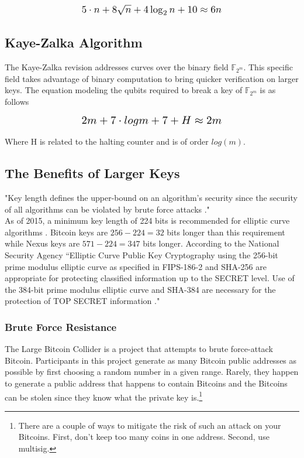 \documentclass[11pt]{article}
\begin{document}
\begin{equation}
\resizebox{.5\hsize}{!}{$5\cdot n + 8 \sqrt{n} + 4 \log_{2} n + 10 \approx 6n$}
\end{equation}

\subsection{Kaye-Zalka Algorithm}
The Kaye-Zalka revision addresses curves over the binary field $\mathbb{F}_{2^m}$. This specific field takes advantage of binary computation to bring quicker verification on larger keys. The equation modeling the qubits required to break a key of $\mathbb{F}_{2^m}$ is as follows \cite{kayezalka}

\begin{equation}
\resizebox{.5\hsize}{!}{$2 m + 7\cdot log m + 7 + H \approx 2m$}
\end{equation}

\noindent Where H is related to the halting counter and is of order $log(m)$.

\subsection{The Benefits of Larger Keys}

"Key length defines the upper-bound on an algorithm's security 
since the security of all algorithms can be violated by brute force attacks \cite{wikikeysize}." \\ 

\noindent As of 2015, a minimum key length of 224 bits is recommended for elliptic curve algorithms \cite{bruteforce}.
Bitcoin keys are $256-224 = 32$ bits longer than this requirement while Nexus keys are $571-224 = 347$ bits longer.
\noindent According to the National Security Agency 
``Elliptic Curve Public Key Cryptography using the 256-bit prime modulus elliptic curve as specified in FIPS-186-2 and SHA-256 are appropriate for protecting classified information up to the SECRET level. 
Use of the 384-bit prime modulus elliptic curve and SHA-384 are necessary for the protection of TOP SECRET information \cite{nsa384}."

\subsubsection*{Brute Force Resistance}

The Large Bitcoin Collider \cite{largebitcoin} is a project that attempts to brute force-attack Bitcoin.
Participants in this project generate as many Bitcoin public addresses as possible by first choosing a random number in a given range.
Rarely, they happen to generate a public address that happens to contain Bitcoins and the Bitcoins can be stolen since they know what the private key is.\footnote{There are a couple of ways to mitigate the risk of such an attack on your Bitcoins. First, don't keep too many coins in one address. Second, use multisig.}\\ 
\end{document}
